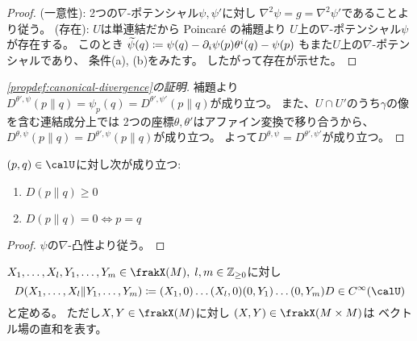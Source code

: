 \documentclass[report]{jlreq}
\begin{document}
\begin{proof}
    (一意性):
    2つの$\nabla$-ポテンシャル$\psi, \psi'$に対し
    $\nabla^2 \psi = g = \nabla^2 \psi'$であることより従う。
    (存在):
    $U$は単連結だから Poincar\'e の補題より
    $U$上の$\nabla$-ポテンシャル$\psi$が存在する。
    このとき
    $\widetilde{\psi}(q) \coloneqq \psi(q) - \partial_i \psi(p) \theta^i(q) - \psi(p)$
    もまた$U$上の$\nabla$-ポテンシャルであり、
    条件(a), (b)をみたす。
    したがって存在が示せた。
\end{proof}

\begin{proof}[\cref{propdef:canonical-divergence}の証明]
    補題より
    $D^{\theta', \psi}(p \| q) = \psi_p(q) = D^{\theta', \psi'}(p \| q)$が成り立つ。
    また、$U \cap U'$のうち$\gamma$の像を含む連結成分上では
    2つの座標$\theta, \theta'$はアファイン変換で移り合うから、
    $D^{\theta, \psi}(p \| q) = D^{\theta', \psi}(p \| q)$が成り立つ。
    よって$D^{\theta, \psi} = D^{\theta', \psi'}$が成り立つ。
\end{proof}

\begin{proposition}
    $(p, q) \in \calU$に対し次が成り立つ:
    \begin{enumerate}
        \item $D(p \| q) \ge 0$
        \item $D(p \| q) = 0 \iff p = q$
    \end{enumerate}
\end{proposition}

\begin{proof}
    $\psi$の$\nabla$-凸性より従う。
\end{proof}

\begin{definition}[$D$へのベクトル場の作用の記法]
    $X_1, \dots, X_l, Y_1, \dots, Y_m \in \frakX(M), \;
        l, m \in \Z_{\ge 0}$に対し
    \begin{equation}
        D(X_1, \dots, X_l \| Y_1, \dots, Y_m)
            \coloneqq
                (X_1, 0) \dots (X_l, 0) (0, Y_1) \dots (0, Y_m) D
                \in \smooth(\calU)
    \end{equation}
    と定める。
    ただし$X, Y \in \frakX(M)$に対し
    $(X, Y) \in \frakX(M \times M)$は
    ベクトル場の直和を表す。
\end{definition}
\end{document}
